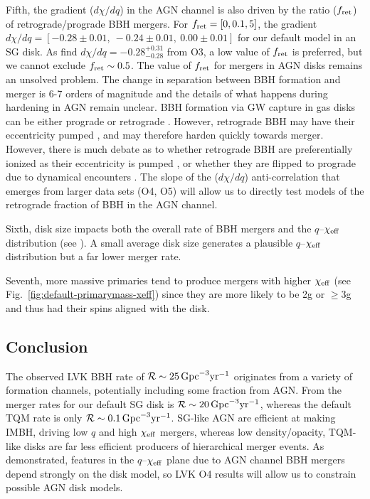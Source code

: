Fifth, the gradient ($d\chi/dq$) in the AGN channel is also driven by the ratio ($f_{\rm ret}$) of retrograde/prograde BBH mergers.
For $f_{\rm ret}=[0,0.1,5]$, the gradient $d\chi/dq=[-0.28\pm0.01,\ -0.24\pm0.01,\ 0.00\pm0.01]$ for our default model in an SG disk.
As \citet{Callister+21} find $d\chi/dq = -0.28^{+0.31}_{-0.28}$ from O3, a low value of $f_{\rm ret}$ is preferred, but we cannot exclude $f_{\rm ret} \sim 0.5$.
The value of $f_{\rm ret}$ for mergers in AGN disks remains an unsolved problem.
The change in separation between BBH formation and merger is 6-7 orders of magnitude and the details of what happens during hardening in AGN remain unclear.
BBH formation via GW capture in gas disks can be either prograde or retrograde \citep[e.g.][]{DeLaurentiis+23,Whitehead+24,QianLiLai24}.
However, retrograde BBH may have their eccentricity pumped \citep{Li+22-bbh-evo,Calcino+23}, and may therefore harden quickly towards merger.
However, there is much debate as to whether retrograde BBH are preferentially ionized as their eccentricity is pumped \citep{Wang+21}, or whether they are flipped to prograde due to dynamical encounters \citep{Samsing+22,McKernanFord24}.
The slope of the ($d\chi/dq$) anti-correlation that emerges from larger data sets (O4, O5) will allow us to directly test models of the retrograde fraction of BBH in the AGN channel.

Sixth, disk size impacts both the overall rate of BBH mergers and the $q$--$\chi_{\rm eff}$ distribution (see ).
A small average disk size generates a plausible $q$--$\chi_{\rm eff}$ distribution but a far lower merger rate.

Seventh, more massive primaries tend to produce mergers with higher $\chi_{\rm eff}$ (see Fig.~\ref{fig:default-primarymass-xeff}) since they are more likely to be 2g or $\geq$3g and thus had their spins aligned with the disk.

\subsection{Conclusion}
The observed LVK BBH rate of $\mathcal{R} \sim 25\,{\rm Gpc}^{-3} {\rm yr}^{-1}$ \citep{Abbott+23-O3b} originates from a variety of formation channels, potentially including some fraction from AGN.
From \citet{McKernan+25-mcfactsI} the merger rates for our default SG disk is $\mathcal{R} \sim 20\,{\rm Gpc}^{-3} \rm{yr}^{-1}$, whereas the default TQM rate is only $\mathcal{R} \sim 0.1\,{\rm Gpc}^{-3} \rm{yr}^{-1}$.
SG-like AGN are efficient at making IMBH, driving low $q$ and high $\chi_{\rm eff}$ mergers, whereas low density/opacity, TQM-like disks are far less efficient producers of hierarchical merger events.
As demonstrated, features in the $q$--$\chi_{\rm eff}$ plane due to AGN channel BBH mergers depend strongly on the disk model, so LVK O4 results will allow us to constrain possible AGN disk models.

